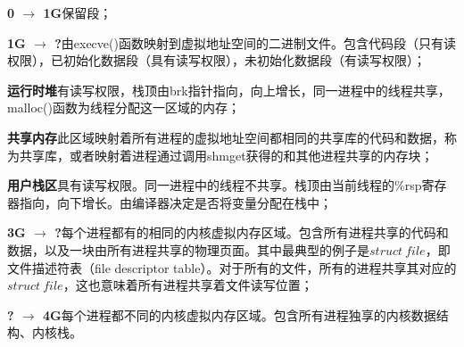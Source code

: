 \noindent\textbf{0 $\rightarrow$ 1G}\quad 保留段；

\noindent\textbf{1G $\rightarrow$ ?}\quad 由execve()函数映射到虚拟地址空间的二进制文件。包含代码段（只有读权限），已初始化数据段（具有读写权限），未初始化数据段（有读写权限）；

\noindent\textbf{运行时堆}\quad 有读写权限，栈顶由brk指针指向，向上增长，同一进程中的线程共享，malloc()函数为线程分配这一区域的内存；

\noindent\textbf{共享内存}\quad 此区域映射着所有进程的虚拟地址空间都相同的共享库的代码和数据，称为共享库，或者映射着进程通过调用shmget获得的和其他进程共享的内存块；

\noindent\textbf{用户栈区}\quad 具有读写权限。同一进程中的线程不共享。栈顶由当前线程的\%rsp寄存器指向，向下增长。由编译器决定是否将变量分配在栈中；

\noindent\textbf{3G $\rightarrow$ ?}\quad 每个进程都有的相同的内核虚拟内存区域。包含所有进程共享的代码和数据，以及一块由所有进程共享的物理页面。其中最典型的例子是$struct\ file$，即文件描述符表（file descriptor table）。对于所有的文件，所有的进程共享其对应的$struct\ file$，这也意味着所有进程共享着文件读写位置；

\noindent\textbf{? $ \rightarrow$ 4G}\quad 每个进程都不同的内核虚拟内存区域。包含所有进程独享的内核数据结构、内核栈。



